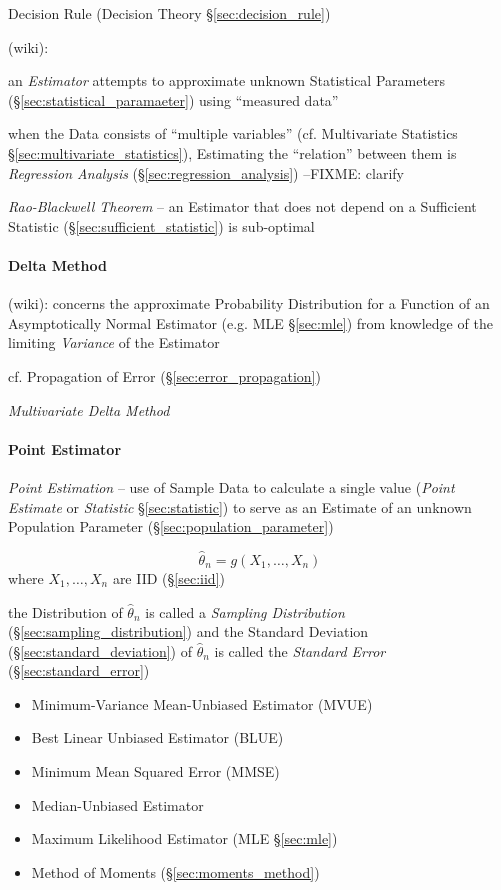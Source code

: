 \fist Decision Rule (Decision Theory \S\ref{sec:decision_rule})

(wiki):

an \emph{Estimator} attempts to approximate unknown Statistical Parameters
(\S\ref{sec:statistical_paramaeter}) using ``measured data''

when the Data consists of ``multiple variables'' (cf. Multivariate Statistics
\S\ref{sec:multivariate_statistics}), Estimating the ``relation'' between them
is \emph{Regression Analysis} (\S\ref{sec:regression_analysis})
--FIXME: clarify

\emph{Rao-Blackwell Theorem} -- an Estimator that does not depend on a
Sufficient Statistic (\S\ref{sec:sufficient_statistic}) is sub-optimal



\paragraph{Delta Method}\label{sec:delta_method}\hfill

(wiki): concerns the approximate Probability Distribution for a Function of an
Asymptotically Normal Estimator (e.g. MLE \S\ref{sec:mle}) from knowledge of the
limiting \emph{Variance} of the Estimator

\fist cf. Propagation of Error (\S\ref{sec:error_propagation})

\emph{Multivariate Delta Method}



\paragraph{Point Estimator}\label{sec:point_estimator}\hfill

\emph{Point Estimation} -- use of Sample Data to calculate a single value
(\emph{Point Estimate} or \emph{Statistic} \S\ref{sec:statistic}) to serve as an
Estimate of an unknown Population Parameter (\S\ref{sec:population_parameter})

\[
  \hat{\theta}_n = g(X_1, \ldots, X_n)
\]
where $X_1, \ldots, X_n$ are IID (\S\ref{sec:iid})

the Distribution of $\hat{\theta}_n$ is called a \emph{Sampling Distribution}
(\S\ref{sec:sampling_distribution}) and the Standard Deviation
(\S\ref{sec:standard_deviation}) of $\hat{\theta}_n$ is called the
\emph{Standard Error} (\S\ref{sec:standard_error})

\begin{itemize}
  \item Minimum-Variance Mean-Unbiased Estimator (MVUE)
  \item Best Linear Unbiased Estimator (BLUE)
  \item Minimum Mean Squared Error (MMSE)
  \item Median-Unbiased Estimator
  \item Maximum Likelihood Estimator (MLE \S\ref{sec:mle})
  \item Method of Moments (\S\ref{sec:moments_method})
\end{itemize}

